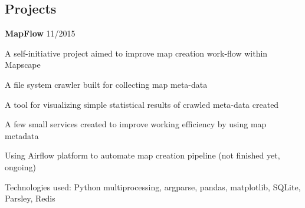 \documentclass[margin,line]{resume}
\begin{document}
\begin{resume}

    \section{\myheadingstyle Projects}

    \textbf{MapFlow} \hfill 11/2015 \vspace{-3mm}\\\vspace{-1mm}%
      \begin{list2}
       \item A self-initiative project aimed to improve map creation work-flow within Mapscape
       \item A file system crawler built for collecting map meta-data
       \item A tool for visualizing simple statistical results of crawled meta-data created
       \item A few small services created to improve working efficiency by using map metadata
       \item Using Airflow platform to automate map creation pipeline (not finished yet, ongoing)
       \item Technologies used: Python multiprocessing, argparse, pandas, matplotlib, SQLite, Parsley, Redis
      \end{list2}

    \newpage


\end{resume}
\end{document}
